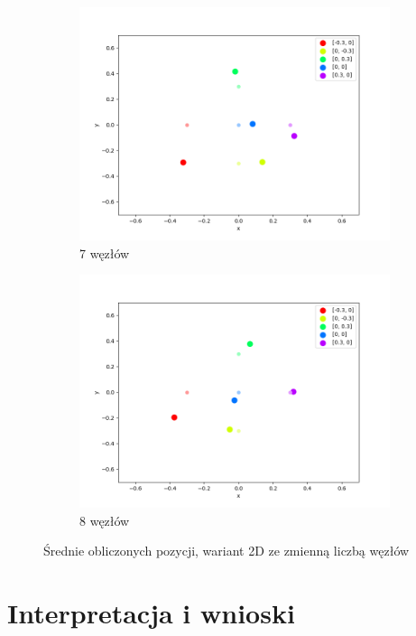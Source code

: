 \begin{figure}[h]
\begin{subfigure}{.5\textwidth}
    \includegraphics[width=\linewidth]{pics/mult_lat_2d_num/positions_7_mean.png}
\caption{7 węzłów}
\label{pic:2d_7_num_mult}
\end{subfigure}%
\begin{subfigure}{.5\textwidth}
    \centering
    \includegraphics[width=\linewidth]{pics/mult_lat_2d_num/positions_8_mean.png}
\caption{8 węzłów}
\label{pic:2d_8_num_mult}
\end{subfigure}
\caption{Średnie obliczonych pozycji, wariant 2D ze zmienną liczbą węzłów}
\label{pic:2d_num_mult}
\end{figure}

\section{Interpretacja i wnioski}